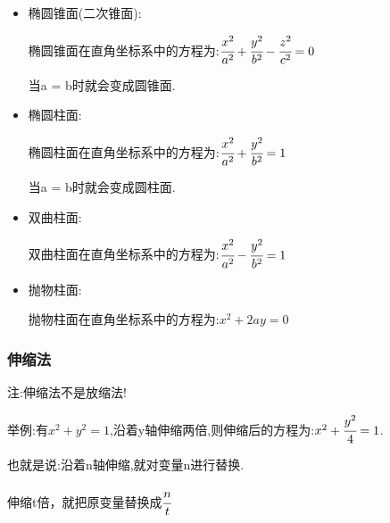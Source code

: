 {{{\begin{itemize}
{\begin{itemize}
{                      可化作三元二次方程:$Ax^2 + Ay^2 + Az^2 + Bx + Cy + Dz + G = 0$(平方项系数相同)

                      其中$D^2 + E^2 + F^2 > 4AG$.

                      当满足以上两点时可逆推出一个三元二次方程是否为一个球面

                      (当$D^2 + E^2 + F^2 = 4AG$时是一个点)
                      }
                \item {
                      椭圆锥面(二次锥面):

                      椭圆锥面在直角坐标系中的方程为:$\cfrac{x^2}{a^2} + \cfrac{y^2}{b^2} - \cfrac{z^2}{c^2} = 0$

                      当a = b时就会变成圆锥面.
                      }
                \item {
                      椭圆柱面:

                      椭圆柱面在直角坐标系中的方程为:$\cfrac{x^2}{a^2} + \cfrac{y^2}{b^2} = 1$

                      当a = b时就会变成圆柱面.
                      }
                \item {
                      双曲柱面:

                      双曲柱面在直角坐标系中的方程为:$\cfrac{x^2}{a^2} - \cfrac{y^2}{b^2} = 1$
                      }
                \item {
                      抛物柱面:

                      抛物柱面在直角坐标系中的方程为:$x^2 + 2ay = 0$
                      }
              \end{itemize}
              }
      \end{itemize}
    }%

    \subsubsection{伸缩法}{
      注:伸缩法不是放缩法!

      举例:有$x^2 + y^2 = 1$,沿着y轴伸缩两倍,则伸缩后的方程为:$x^2 + \cfrac{y^2}{4} = 1$.

      也就是说:沿着n轴伸缩,就对变量n进行替换.

      伸缩t倍，就把原变量替换成$\cfrac{n}{t}$
    }%
  }%

 }%